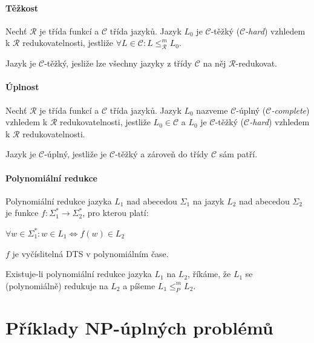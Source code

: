 \paragraph*{Těžkost} Nechť $\mathcal{R}$ je třída funkcí a $\mathcal{C}$ třída jazyků. Jazyk $L_0$ je $\mathcal{C}$-těžký ($\mathcal{C}$\textit{-hard}) vzhledem k $\mathcal{R}$ redukovatelnosti, jestliže $\forall L \in \mathcal{C} : L \leq_\mathcal{R}^m L_0$. \begin{compactitem}
    \item Jazyk je $\mathcal{C}$-těžký, jesliže lze všechny jazyky z třídy $\mathcal{C}$ na něj $\mathcal{R}$-redukovat.
\end{compactitem}

\paragraph*{Úplnost} Nechť $\mathcal{R}$ je třída funkcí a $\mathcal{C}$ třída jazyků. Jazyk $L_0$ nazveme $\mathcal{C}$-úplný ($\mathcal{C}$\textit{-complete}) vzhledem k $\mathcal{R}$ redukovatelnosti, jestliže $L_0 \in \mathcal{C}$ a $L_0$ je $\mathcal{C}$-těžký ($\mathcal{C}$\textit{-hard}) vzhledem k $\mathcal{R}$ redukovatelnosti. \begin{compactitem}
    \item Jazyk je $\mathcal{C}$-úplný, jestliže je $\mathcal{C}$-těžký  a zároveň do třídy $\mathcal{C}$ sám patří.
\end{compactitem}

\paragraph*{Polynomiální redukce} Polynomiální redukce jazyka $L_1$ nad abecedou $\Sigma_1$ na jazyk $L_2$ nad abecedou $\Sigma_2$ je funkce $f : \Sigma_1^* \rightarrow \Sigma_2^*$, pro kterou platí: \begin{compactitem}
    \item $\forall w \in \Sigma_1^* : w \in L_1 \Leftrightarrow f(w) \in L_2$
    \item $f$ je vyčíslitelná DTS v polynomiálním čase.
\end{compactitem}
Existuje-li polynomiální redukce jazyka $L_1$ na $L_2$, říkáme, že $L_1$ se (polynomiálně) redukuje na $L_2$ a píšeme $L_1 \leq_P^m L_2$.


\section{Příklady NP-úplných problémů}

